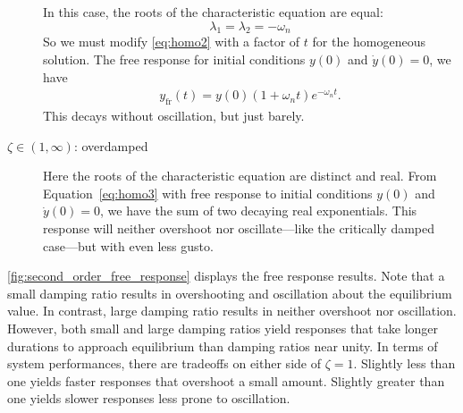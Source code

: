 \documentclass[dynamic_systems.tex]{subfiles}
\begin{document}
\begin{description}
		In this case, the roots of the characteristic equation are equal:
		\begin{equation}
			\lambda_1 = \lambda_2 = -\omega_n
		\end{equation}
		So we must modify \autoref{eq:homo2} with a factor of $t$ for the homogeneous solution.
		The free response for initial conditions $y(0)$ and $\dot{y}(0) = 0$, we have
		\begin{align}
			y_\text{fr}(t) = y(0) \left ( 1 + \omega_n t \right ) e^{-\omega_n t}.
		\end{align}
		This decays without oscillation, but just barely.
	\item[$\zeta \in (1,\infty)$: overdamped]
		Here the roots of the characteristic equation are distinct and real.
		From Equation~\eqref{eq:homo3} with free response to initial conditions $y(0)$ and $\dot{y}(0) = 0$, we have the sum of two decaying real exponentials.
		This response will neither overshoot nor oscillate---like the critically damped case---but with even less gusto.
\end{description}

\autoref{fig:second_order_free_response} displays the free response results.
Note that a small damping ratio results in overshooting and oscillation about the equilibrium value.
In contrast, large damping ratio results in neither overshoot nor oscillation.
However, both small and large damping ratios yield responses that take longer durations to approach equilibrium than damping ratios near unity.
In terms of system performances, there are tradeoffs on either side of $\zeta=1$.
Slightly less than one yields faster responses that overshoot a small amount.
Slightly greater than one yields slower responses less prone to oscillation.
\end{document}
